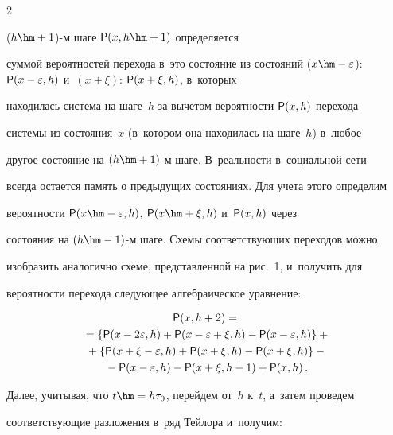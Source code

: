 \begin{multicols}{2}
\addtocounter{figure}{1}





\noindent


 ($h\hm+1$)-м шаге ${\sf P}(x, h\hm+1)$ определяется 


суммой вероятностей перехода в~это состояние из состояний ($x\hm-


\varepsilon$): ${\sf P}(x-\varepsilon, h)$ и~$(x+\xi)$: ${\sf P}(x+\xi, h)$, в~которых 


находилась система на шаге~$h$ за вычетом вероятности ${\sf P}(x, h)$ перехода 


системы из состояния~$x$ (в~котором она находилась на шаге~$h$) в~любое 


другое состояние на $(h\hm+1)$-м шаге. В~реальности в~социальной сети 


всегда остается память о предыдущих состояниях. Для учета этого определим 


вероятности ${\sf P}(x\hm- \varepsilon,h)$, ${\sf P}(x\hm+\xi, h)$ и~${\sf P}(x, h)$ через 


состояния на $(h\hm-1)$-м шаге. Схемы соответствующих переходов можно 


изобразить аналогично схеме, представленной на рис.~1, и~получить для 


вероятности перехода следующее алгебраическое уравнение:


  \begin{multline*}


  {\sf P}(x,h+2)={}\\


  {}=\{ {\sf P}(x-2\varepsilon, h)+{\sf P}(x-\varepsilon+\xi, h) -{\sf P}(x-\varepsilon, 


h)\}+{}\\


  {}+ \{ {\sf P}(x+\xi-\varepsilon,h)+ {\sf P}(x+\xi,h) -{\sf P}(x+\xi,h)\} -{}\\


  {}-{\sf P}(x-\varepsilon,h)- {\sf P}(x+\xi, h-1)+ {\sf P}(x,h)\,.




\end{multline*}


Далее, учитывая, что $t\hm=h\tau_0$, перейдем от~$h$ к~$t$, а~затем проведем 


соответствующие разложения в~ряд Тейлора и~получим:


\begin{equation}



\end{equation}
\end{multicols}
